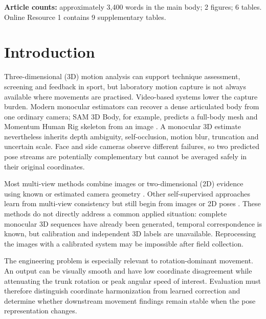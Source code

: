 \documentclass[lineno,pdflatex,sn-mathphys-num]{sn-jnl}
\begin{document}
\noindent\textbf{Article counts:} approximately 3,400 words in the main body; 2
figures; 6 tables. Online Resource 1 contains 9 supplementary tables.

\section{Introduction}\label{sec:introduction}

Three-dimensional (3D) motion analysis can support technique assessment,
screening and feedback in sport, but laboratory motion capture is not always
available where movements are practised. Video-based systems lower the capture
burden. Modern monocular estimators can recover a dense articulated body from
one ordinary camera; SAM 3D Body, for example, predicts a full-body mesh and
Momentum Human Rig skeleton from an image \cite{Yang2026SAM3DBody}. A monocular
3D estimate nevertheless inherits depth ambiguity, self-occlusion, motion blur,
truncation and uncertain scale. Face and side cameras observe different
failures, so two predicted pose streams are potentially complementary but
cannot be averaged safely in their original coordinates.

Most multi-view methods combine images or two-dimensional (2D) evidence using
known or estimated camera geometry \cite{Iskakov2019Learnable,Qiu2019CrossView,
Remelli2020Lightweight,Jiang2023Probabilistic}. Other self-supervised approaches
learn from multi-view consistency but still begin from images or 2D poses
\cite{Kim2022CrossViewSelfFusion,Usman2022MetaPose,Srivastav2024SelfPose3D}.
These methods do not directly address a common applied situation: complete
monocular 3D sequences have already been generated, temporal correspondence is
known, but calibration and independent 3D labels are unavailable. Reprocessing
the images with a calibrated system may be impossible after field collection.

The engineering problem is especially relevant to rotation-dominant movement.
An output can be visually smooth and have low coordinate disagreement while
attenuating the trunk rotation or peak angular speed of interest. Evaluation
must therefore distinguish coordinate harmonization from learned correction
and determine whether downstream movement findings remain stable when the pose
representation changes.
\end{document}
